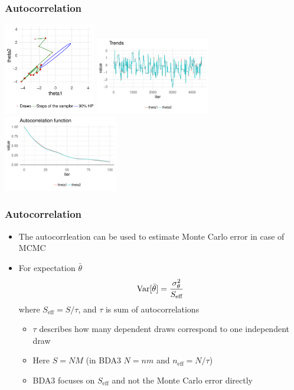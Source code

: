 \documentclass[10pt]{beamer}
\begin{document}
\begin{frame}

\frametitle{Autocorrelation}

  \vspace{-0.5\baselineskip}
  \includegraphics[width=4cm]{figs/Metrop3.pdf}
  {\includegraphics[width=5cm]{figs/Metrop3trace.pdf}\\}
  {\includegraphics[width=5cm]{figs/Metrop3acf.pdf}}

\end{frame}

\begin{frame}

\frametitle{Autocorrelation}

  \begin{itemize}
  \item The autocorrleation can be used to estimate Monte Carlo error in case of MCMC
  \item For expectation $\bar{\theta}$
    \begin{equation*}
      \mathrm{Var}[\bar{\theta}] = \frac{\sigma^2_\theta}{S_\text{eff}}
    \end{equation*}
    where $S_\text{eff}=S/\tau$, and $\tau$ is sum of autocorrelations
    \begin{itemize}
      \item<2-> $\tau$ describes how many dependent draws correspond to one independent draw
      \item<3-> Here $S=NM$ (in BDA3 $N=nm$ and $n_\text{eff}=N/\tau$)
      \item<4-> BDA3 focuses on $S_\text{eff}$ and not the Monte Carlo error directly
    \end{itemize}
  \end{itemize}
\end{frame}
\end{document}
